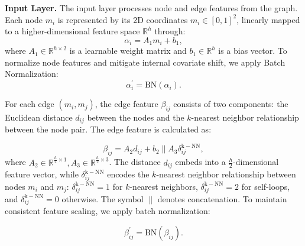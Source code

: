 \documentclass[sigconf]{acmart}
\begin{document}
\textbf{Input Layer.} The input layer processes node and edge features from the graph. Each node $m_i$ is represented by its 2D coordinates $m_i\in\left[0,1\right]^2$, linearly mapped to a higher-dimensional feature space $\mathbb{R}^{h}$ through:
\begin{equation}
     \alpha_i=A_1m_{i}+b_1,
\end{equation}
where $A_1\in\mathbb{R}^{h\times2}$ is a learnable weight matrix and $b_1\in\mathbb{R}^h$ is a bias vector. To normalize node features and mitigate internal covariate shift, we apply Batch Normalization:
\begin{equation}
     \alpha_i^{\prime}=\mathrm{BN}(\alpha_i).
\end{equation}

For each edge $(m_i,m_j)$, the edge feature $\beta_{ij}$ consists of two components: the Euclidean distance $d_{ij}$ between the nodes and the $k$-nearest neighbor relationship between the node pair. The edge feature is calculated as:

\begin{equation}
    \beta_{ij}=A_2d_{ij}+b_2\parallel A_3\delta_{ij}^{\mathrm{k-NN}},
\end{equation}
where $A_{2}\in\mathbb{R}^{\frac{h}{2}\times1},A_{3}\in\mathbb{R}^{\frac{h}{2}\times3}$. The distance $d_{ij}$ embeds into a $\frac{h}{2}$-dimensional feature vector, while $\delta_{ij}^{\mathrm{k-NN}}$ encodes the $k$-nearest neighbor relationship between nodes $m_i$ and $m_j$: $\delta_{ij}^{\mathrm{k-NN}}=1$ for $k$-nearest neighbors, $\delta_{ij}^{\mathrm{k-NN}}=2$ for self-loops, and $\delta_{ij}^{\mathrm{k-NN}}=0$ otherwise. The symbol $\parallel$ denotes concatenation. To maintain consistent feature scaling, we apply batch normalization:


\begin{equation}
    \beta_{ij}^{\prime}=\mathrm{BN}(\beta_{ij}).
\end{equation}
\end{document}
